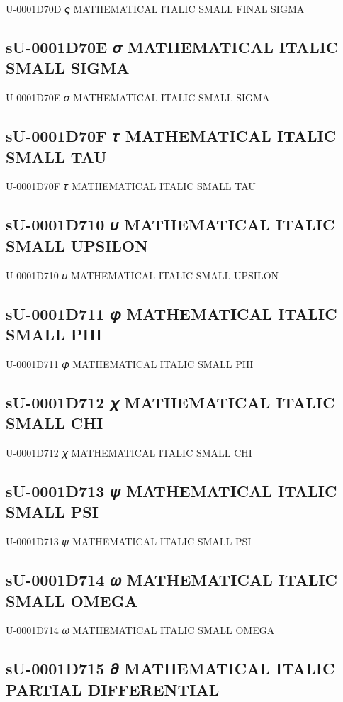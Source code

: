 U-0001D70D 𝜍 MATHEMATICAL ITALIC SMALL FINAL SIGMA

\subsection{sU-0001D70E 𝜎 MATHEMATICAL ITALIC SMALL SIGMA}

U-0001D70E 𝜎 MATHEMATICAL ITALIC SMALL SIGMA

\subsection{sU-0001D70F 𝜏 MATHEMATICAL ITALIC SMALL TAU}

U-0001D70F 𝜏 MATHEMATICAL ITALIC SMALL TAU

\subsection{sU-0001D710 𝜐 MATHEMATICAL ITALIC SMALL UPSILON}

U-0001D710 𝜐 MATHEMATICAL ITALIC SMALL UPSILON

\subsection{sU-0001D711 𝜑 MATHEMATICAL ITALIC SMALL PHI}

U-0001D711 𝜑 MATHEMATICAL ITALIC SMALL PHI

\subsection{sU-0001D712 𝜒 MATHEMATICAL ITALIC SMALL CHI}

U-0001D712 𝜒 MATHEMATICAL ITALIC SMALL CHI

\subsection{sU-0001D713 𝜓 MATHEMATICAL ITALIC SMALL PSI}

U-0001D713 𝜓 MATHEMATICAL ITALIC SMALL PSI

\subsection{sU-0001D714 𝜔 MATHEMATICAL ITALIC SMALL OMEGA}

U-0001D714 𝜔 MATHEMATICAL ITALIC SMALL OMEGA

\subsection{sU-0001D715 𝜕 MATHEMATICAL ITALIC PARTIAL DIFFERENTIAL}

